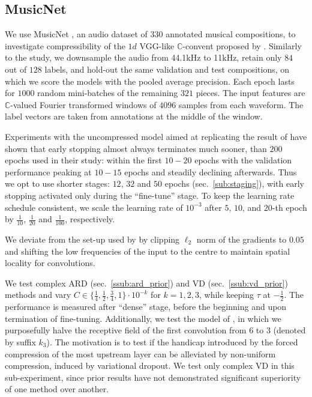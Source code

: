 \documentclass[a4paper,10pt,onecolumn]{article}
\newcommand{\cplx}{\mathbb{C}}
\begin{document}


\subsection{MusicNet} %
\label{sub:musicnet}

We use MusicNet \citep{thickstun_learning_2017}, an audio dataset of $330$ annotated
musical compositions, to investigate compressibility of the $1d$ VGG-like $\cplx$-convent
proposed by \citet{trabelsi_deep_2017}. Similarly to the study, we downsample the audio
from 44.1kHz to 11kHz, retain only $84$ out of $128$ labels, and hold-out the same validation
and test compositions, on which we score the models with the pooled average precision.
Each epoch lasts for $1000$ random mini-batches of the remaining $321$ pieces. The input
features are $\cplx$-valued Fourier transformed windows of $4096$ samples from each waveform.
The label vectors are taken from annotations at the middle of the window.

Experiments with the uncompressed model aimed at replicating the result of \citet{trabelsi_deep_2017}
have shown that early stopping almost always terminates much sooner, than $200$ epochs used
in their study: within the first $10-20$ epochs with the validation performance peaking at
$10-15$ epochs and steadily declining afterwards.
%
Thus we opt to use shorter stages: $12$, $32$ and $50$ epochs (sec.~\ref{sub:staging}), with
early stopping activated only during the ``fine-tune'' stage. To keep the learning rate schedule
consistent, we scale the learning rate of $10^{-3}$ after $5$, $10$, and $20$-th epoch by
$\tfrac1{10}$, $\tfrac1{20}$ and $\tfrac1{100}$, respectively.

We deviate from the set-up used by \citet{trabelsi_deep_2017} by clipping $\ell_2$ norm of the
gradients to $0.05$ and shifting the low frequencies of the input to the centre to maintain
spatial locality for convolutions.

We test complex ARD (sec.~\ref{ssub:ard_prior}) and VD (sec.~\ref{ssub:vd_prior}) methods
and vary $
  C \in \{\tfrac14, \tfrac12, \tfrac34, 1\} \cdot 10^{-k}
$ for $k=1, 2, 3$, while keeping $\tau$ at $-\tfrac12$. The performance is measured after
``dense'' stage, before the beginning and upon termination of fine-tuning.
%
Additionally, we test the model of \citet{trabelsi_deep_2017}, in which we purposefully
halve the receptive field of the first convolution from $6$ to $3$ (denoted by suffix $k_3$).
The motivation is to test if the handicap introduced by the forced compression of the most
upstream layer can be alleviated by non-uniform compression, induced by variational dropout.
We test only complex VD in this sub-experiment, since prior results have not demonstrated
significant superiority of one method over another.  %
\end{document}

